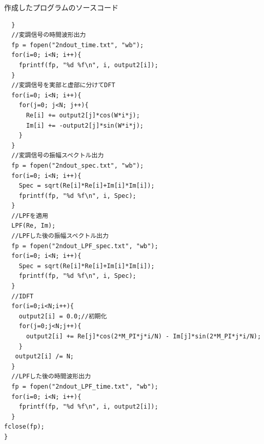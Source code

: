 \documentclass[a4j]{jsarticle}
\begin{document}
\newpage
\begin{itembox}[c]{作成したプログラムのソースコード}{
\small
\begin{verbatim}
  }
  //変調信号の時間波形出力
  fp = fopen("2ndout_time.txt", "wb");
  for(i=0; i<N; i++){
    fprintf(fp, "%d %f\n", i, output2[i]);
  }
  //変調信号を実部と虚部に分けてDFT
  for(i=0; i<N; i++){
    for(j=0; j<N; j++){
      Re[i] += output2[j]*cos(W*i*j);
      Im[i] += -output2[j]*sin(W*i*j);
    }
  }
  //変調信号の振幅スペクトル出力
  fp = fopen("2ndout_spec.txt", "wb");
  for(i=0; i<N; i++){
    Spec = sqrt(Re[i]*Re[i]+Im[i]*Im[i]);
    fprintf(fp, "%d %f\n", i, Spec);
  }
  //LPFを適用
  LPF(Re, Im);
  //LPFした後の振幅スペクトル出力
  fp = fopen("2ndout_LPF_spec.txt", "wb");
  for(i=0; i<N; i++){
    Spec = sqrt(Re[i]*Re[i]+Im[i]*Im[i]);
    fprintf(fp, "%d %f\n", i, Spec);
  }
  //IDFT
  for(i=0;i<N;i++){
    output2[i] = 0.0;//初期化
    for(j=0;j<N;j++){
      output2[i] += Re[j]*cos(2*M_PI*j*i/N) - Im[j]*sin(2*M_PI*j*i/N);
    }
   output2[i] /= N;
  }
  //LPFした後の時間波形出力
  fp = fopen("2ndout_LPF_time.txt", "wb");
  for(i=0; i<N; i++){
    fprintf(fp, "%d %f\n", i, output2[i]);
  }
fclose(fp);
}
\end{verbatim}}
\end{itembox}
\end{document}
